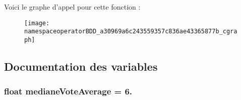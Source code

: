 Voici le graphe d'appel pour cette fonction \-:\nopagebreak
\begin{figure}[H]
\begin{center}
\leavevmode
\texttt{[image: namespaceoperatorBDD\_a30969a6c243559357c836ae43365877b\_cgraph]}
\end{center}
\end{figure}




\subsection{Documentation des variables}
\hypertarget{namespaceoperatorBDD_a131e5e7a22125521cf2cb5eb732a0f54}{
\subsubsection[{mediane\-Vote\-Average}]{\setlength{\rightskip}{0pt plus 5cm}float mediane\-Vote\-Average = 6.}}\label{namespaceoperatorBDD_a131e5e7a22125521cf2cb5eb732a0f54}
